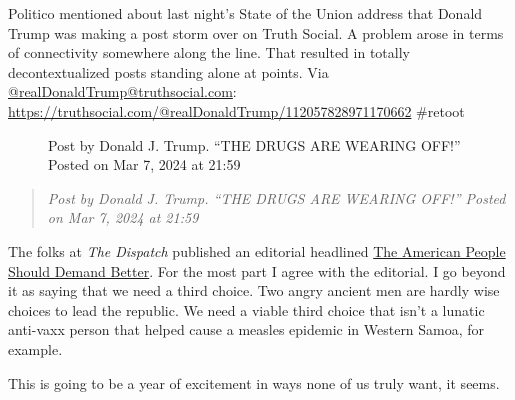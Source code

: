 Politico mentioned about last night's State of the Union address that
Donald Trump was making a post storm over on Truth Social. A problem
arose in terms of connectivity somewhere along the line. That resulted
in totally decontextualized posts standing alone at points. Via
\href{https://example.com/I-Will-Not-Link-To-This-Fascist}{@realDonaldTrump@truthsocial.com}:
\href{https://example.com/I-Will-Not-Link-To-This-Fascist}{https://truthsocial.com/@realDonaldTrump/112057828971170662}
\#retoot

\begin{figure}
\centering
{}
\caption{Post by Donald J. Trump. ``THE DRUGS ARE WEARING OFF!'' Posted
on Mar 7, 2024 at 21:59}
\end{figure}

\begin{quote}
\emph{Post by Donald J. Trump. ``THE DRUGS ARE WEARING OFF!'' Posted on
Mar 7, 2024 at 21:59}
\end{quote}

The folks at \emph{The Dispatch} published an editorial headlined
\href{https://thedispatch.com/article/the-american-people-deserve-better/}{The
American People Should Demand Better}. For the most part I agree with
the editorial. I go beyond it as saying that we need a third choice. Two
angry ancient men are hardly wise choices to lead the republic. We need
a viable third choice that isn't a lunatic anti-vaxx person that helped
cause a measles epidemic in Western Samoa, for example.

This is going to be a year of excitement in ways none of us truly want,
it seems.
